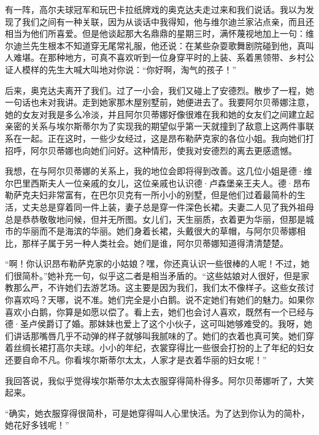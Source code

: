 \par 有一阵，高尔夫球冠军和玩巴卡拉纸牌戏的奥克达夫走过来和我们说话。我以为发现了我们之间有一种关联，因为从谈话中我得知，他与维尔迪兰家沾点亲，而且还相当为他们所喜爱。但是他谈起那大名鼎鼎的星期三时，满怀蔑视地加上一句：维尔迪兰先生根本不知道穿无尾常礼服，他还说：在某些杂耍歌舞剧院碰到他，真叫人难堪。在那种地方，可真不喜欢听到一位身穿平时的上装、系着黑领带、乡村公证人模样的先生大喊大叫地对你说：“你好啊，淘气的孩子！”
\par 后来，奥克达夫离开了我们。过了一小会，我们又碰上了安德烈。散步了一程，她一句话也未对我讲。走到她家那木屋别墅前，她便进去了。我要阿尔贝蒂娜注意，她的女友对我是多么冷淡，并且阿尔贝蒂娜好像很难在我和她的女友们之间建立起亲密的关系与埃尔斯蒂尔为了实现我的期望似乎第一天就撞到了敌意上这两件事联系在一起。正在这时，一些少女经过，这是昂布勒萨克家的各位小姐。我向她们打招呼，阿尔贝蒂娜也向她们问好。这种情形，使我对安德烈的离去更感遗憾。
\par 我想，在与阿尔贝蒂娜的关系上，我的地位会即将得到改善。这几位小姐是德·维尔巴里西斯夫人一位亲戚的女儿，这位亲戚也认识德·卢森堡亲王夫人。德·昂布勒萨克夫妇非常富有，在巴尔贝克有一所小小的别墅，但是他们过着最简朴的生活，丈夫总是穿着同一件上装，妻子总是穿一件深色长裙。夫妻二人见了我外祖母总是恭恭敬敬地问候，但并无所图。女儿们，天生丽质，衣着更为华丽，但那是城市的华丽而不是海滨的华丽。她们身着长裙，头戴很大的草帽，与阿尔贝蒂娜相比，那样子属于另一种人类社会。她们是谁，阿尔贝蒂娜知道得清清楚楚。
\par “啊！你认识昂布勒萨克家的小姑娘？嘿，你还真认识一些很棒的人呢！不过，她们很简朴。”她补充一句，似乎这二者是相当矛盾的。“这些姑娘对人很好，但是家教那么严，不许她们去游艺场。这主要是因为我们，我们太不像样子。这些女孩讨你喜欢吗？天哪，说不准。她们完全是小白鹅。说不定她们有她们的魅力。如果你喜欢小白鹅，你算是如愿以偿了。看上去，她们也会讨人喜欢，既然有一个已经与德·圣卢侯爵订了婚。那妹妹也爱上了这个小伙子，这可叫她够难受的。我呀，她们讲话那嘴唇几乎不动弹的样子就够叫我腻味的了。她们的衣着也真可笑。她们穿着丝绸长裙打高尔夫球。小小的年纪，衣裳穿得比一些很会打扮的上了年纪的妇女还要自命不凡。你看埃尔斯蒂尔太太，人家才是衣着华丽的妇女呢！”
\par 我回答说，我似乎觉得埃尔斯蒂尔太太衣服穿得简朴得多。阿尔贝蒂娜听了，大笑起来。
\par “确实，她衣服穿得很简朴，可是她穿得叫人心里快活。为了达到你认为的简朴，她花好多钱呢！”
